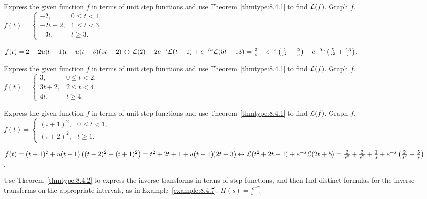 \documentclass{ximera}
\begin{document}
\begin{problem}\label{exer:8.4.16} Express the given function $f$ in terms of unit step functions and use Theorem~\ref{thmtype:8.4.1} to find ${\cal L}(f)$.  Graph $f$.
$f(t)=\left\{\begin{array}{cl}- 2,&0\le
t<1,\\ -2t+2,&1\le t<3,\\ -3t,&t\ge
3.\end{array}\right.$

\begin{solution}
$f(t)=2-2u(t-1)t+u(t-3)(5t-2)
\leftrightarrow {\cal L}(2)-2e^{-s}{\cal L}(t+1)+e^{-3s}{\cal
L}(5t+13)=
\frac{2}{s}-e^{-s}\left(\frac{2}{s^2}+\frac{2}{s}\right)+e^{-3s}\left(\frac{5}{s^2}+\frac{13}{s}\right)$.
\end{solution}
\end{problem}

\begin{problem}\label{exer:8.4.17}  Express the given function $f$ in terms of unit step functions and use Theorem~\ref{thmtype:8.4.1} to find ${\cal L}(f)$.  Graph $f$.
$f(t)=\left\{\begin{array}{cl}3,&0\le t<2,\\ 3t+2,&2\le
t<4,\\ 4t,&t\ge
4.\end{array}\right.$
\end{problem}

\begin{problem}\label{exer:8.4.18}  Express the given function $f$ in terms of unit step functions and use Theorem~\ref{thmtype:8.4.1} to find ${\cal L}(f)$.  Graph $f$.
$f(t)=\left\{\begin{array}{ll}(t+1)^2,&0\le t<1,
\\(t+2)^2,&t\ge1.\end{array}\right.$

\begin{solution}
$f(t)=(t+1)^2+u(t-1)\left((t+2)^2-(t+1)^2\right)
=t^2+2t+1+u(t-1)(2t+3)
\leftrightarrow
{\cal L}(t^2+2t+1)+e^{-s}{\cal L}(2t+5)=
\frac{2}{s^3 }+\frac{2}{s^2}+\frac{1}{s}+e^{-s}\left(\frac{2}{s^2}+\frac{5}{s}\right)$.
\end{solution}
\end{problem}

\begin{problem}\label{exer:8.4.19} Use Theorem~\ref{thmtype:8.4.2} to express the inverse transforms in terms of step functions, and then find distinct formulas for the inverse transforms on the appropriate intervals, as in
Example~\ref{example:8.4.7}.
$H(s)=\frac{e^{-2s}}{s-2}$
\end{problem}
\end{document}
